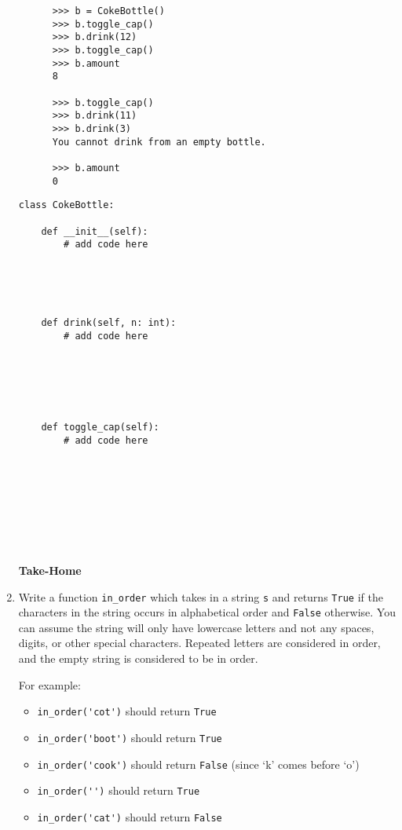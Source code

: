 \documentclass{article}
\begin{document}
\begin{enumerate}
        \begin{verbatim}
      >>> b = CokeBottle()
      >>> b.toggle_cap()
      >>> b.drink(12)
      >>> b.toggle_cap()
      >>> b.amount
      8

      >>> b.toggle_cap()
      >>> b.drink(11)
      >>> b.drink(3)
      You cannot drink from an empty bottle.

      >>> b.amount
      0

    \end{verbatim}

\newpage
\begin{verbatim}
class CokeBottle:

    def __init__(self):
        # add code here





    def drink(self, n: int):
        # add code here






    def toggle_cap(self):
        # add code here









\end{verbatim}


\textbf{Take-Home}

\item  Write a function \verb|in_order| which takes in a string \verb|s| and returns \verb|True| if the characters in the string occurs in alphabetical order and \verb|False| otherwise. You can assume the string will only have lowercase letters and not any spaces, digits, or other special characters. Repeated letters are considered in order, and the empty string is considered to be in order.

    For example:

   \begin{itemize}
  \item \verb|in_order('cot')| should return \verb|True|
  \item \verb|in_order('boot')| should return \verb|True|
  \item \verb|in_order('cook')| should return \verb|False| (since `k' comes before `o')
  \item \verb|in_order('')| should return \verb|True|
  \item \verb|in_order('cat')| should return \verb|False|

\end{itemize}


\end{enumerate}
\end{document}
